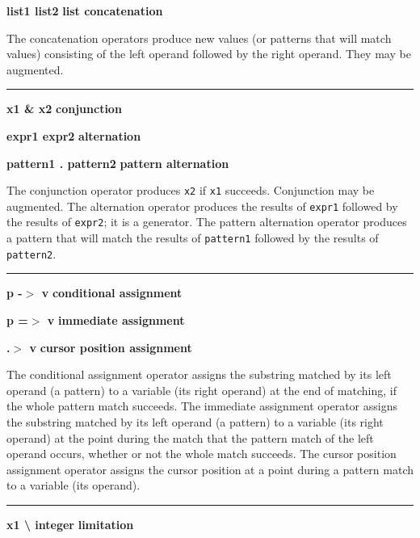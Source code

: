 \noindent
{\bf list1 {\textbar}{\textbar}{\textbar} list2 } \hfill {\bf list concatenation}

\noindent
The concatenation operators produce new values
(or patterns that will match values)
consisting of the left operand followed by the right
operand. They may be augmented.

\bigskip\hrule\vspace{0.1cm}
\noindent
{\bf x1 \& x2 } \hfill {\bf conjunction}

\noindent
{\bf expr1 {\textbar} expr2 } \hfill {\bf alternation}

\noindent
{\bf pattern1 .{\textbar} pattern2 } \hfill {\bf pattern alternation}

\noindent
The conjunction operator produces \texttt{x2} if
\texttt{x1} succeeds. Conjunction may be augmented.
The 
alternation operator produces the results of \texttt{expr1} followed
by the results of \texttt{expr2}; it is a generator.
The 
pattern alternation operator produces a pattern that will match
the results of \texttt{pattern1} followed
by the results of \texttt{pattern2}.


\bigskip\hrule\vspace{0.1cm}
\noindent
{\bf p -$>$ v } \hfill {\bf conditional assignment}

\noindent
{\bf p =$>$ v } \hfill {\bf immediate assignment}

\noindent
{\bf  .$>$ v } \hfill {\bf cursor position assignment}

\noindent
The  conditional assignment operator
assigns the substring matched by its left operand (a pattern) to a
variable (its right operand) at the end of matching, if the whole
pattern match succeeds.
The  immediate assignment operator assigns
the substring matched by its left operand (a pattern) to a variable
(its right operand) at the point during the match that the pattern
match of the left operand occurs, whether or not the whole match succeeds.
The cursor position assignment operator
assigns the cursor position at a point during a pattern match to a
variable (its operand).



\bigskip\hrule\vspace{0.1cm}
\noindent
{\bf x1 {\textbackslash} integer } \hfill {\bf limitation}

